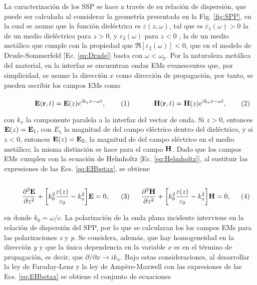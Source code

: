 	La caracterización de los SSP se hace a través de su relación de dispersión, que puede ser calculada al considerar la geometría presentada en la Fig. \ref{fig:SPP}, en la cual se asume que la función dieléctrica es $\varepsilon(z,\omega)$, tal que  es $\varepsilon_1(\omega)>0$  la de un medio dieléctrico para $z>0$, y  $\varepsilon_2(\omega)$  para $z<0$ , la de un medio metálico que cumple con la propiedad que  $\Re[\varepsilon_2(\omega)]<0$, que en el modelo de Drude-Sommerfeld [Ec. \eqref{eq:Drude}] basta con $\omega<\omega_p$.  Por la naturaleza metálica del material, en la interfaz se encuentran ondas EMs evanescentes que, por simplicidad, se asume la dirección $x$ como dirección de propagación, por tanto, se pueden escribir los campos EMs como

	\begin{subequations}\eqhalf{	\vb{E}(\vb{r},t) = \vb{E}(z)e^{ik_x x-\omega t },}
	\eqhalf{\vb{H}(\vb{r},t) = \vb{H}(z)e^{ik_x x-\omega t},}
	\label{eq:EHbetax}\end{subequations} 
	
\noindent con $k_x$ la componente paralela a la interfaz del vector de onda. Si $z>0$, entonces $\vb{E}(z)=\vb{E}_1$, con $E_1$ la magnitud de del campo eléctrico dentro del dieléctrico, y si $z<0$, entonces $\vb{E}(z)=\vb{E}_2$, la magnitud de del campo eléctrico en el medio metálico; la misma distinción se hace para el campo $\vb{H}$. Dado que los campos EMs cumplen con la ecuación de Helmholtz [Ec. \eqref{eq:Helmholtz}], al sustituir las expresiones de las Ecs. \eqref{eq:EHbetax}, se obtiene

	\begin{subequations}
	\eqhalf{	\pdv[2]{\vb{E}}{z} + \qty[k_0^2\frac{\varepsilon(z)}{\varepsilon_0} - k_x^2 ] \vb{E}= 0,\label{eq:helmE}}
	\eqhalf{\pdv[2]{\vb{H}}{z} + \qty[k_0^2\frac{\varepsilon(z)}{\varepsilon_0}  - k_x^2 ] \vb{H}= 0, \label{eq:helmH}}
	\end{subequations} 
	
\noindent en donde $k_0 = \omega/c$.	La polarización de la onda plana incidente interviene en la relación de dispersión del SPP, por lo que se calcularan los los campos EMs para las polarizaciones \emph{s} y \emph{p}. Se considera, además, que  hay homogeneidad en la dirección $y$ y que la única dependencia en la variable $x$  es en el término de propagación, es decir, que $\partial/\partial x\to ik_x$. Bajo estas consideraciones, al desarrollar la ley de Faraday-Lenz y la ley de Ampère-Maxwell con las expresiones de las Ecs. \eqref{eq:EHbetax} se obtiene el conjunto de ecuaciones

